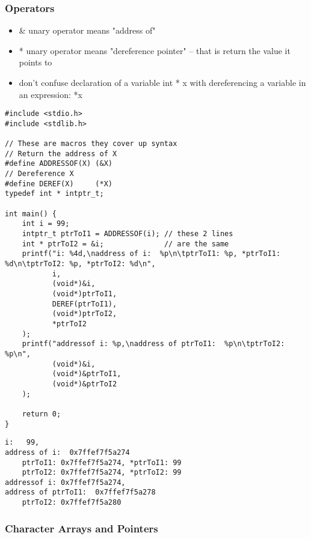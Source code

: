 \documentclass[11pt]{article}
\begin{document}
\subsubsection{Operators}
\label{sec:org8cbbc68}

\begin{itemize}
\item \& unary operator means "address of"
\item * unary operator means "dereference pointer" -- that is return
the value it points to
\item don't confuse declaration of a variable int * x with
dereferencing a variable in an expression: *x
\end{itemize}

\begin{verbatim}
#include <stdio.h>
#include <stdlib.h>

// These are macros they cover up syntax
// Return the address of X
#define ADDRESSOF(X) (&X)
// Dereference X
#define DEREF(X)     (*X)
typedef int * intptr_t;

int main() {
    int i = 99;
    intptr_t ptrToI1 = ADDRESSOF(i); // these 2 lines
    int * ptrToI2 = &i;              // are the same
    printf("i: %4d,\naddress of i:  %p\n\tptrToI1: %p, *ptrToI1: %d\n\tptrToI2: %p, *ptrToI2: %d\n",
           i,
           (void*)&i,
           (void*)ptrToI1,
           DEREF(ptrToI1),
           (void*)ptrToI2,
           *ptrToI2
    );
    printf("addressof i: %p,\naddress of ptrToI1:  %p\n\tptrToI2: %p\n",
           (void*)&i,
           (void*)&ptrToI1,
           (void*)&ptrToI2
    );

    return 0;
}
\end{verbatim}

\begin{verbatim}
i:   99,
address of i:  0x7ffef7f5a274
	ptrToI1: 0x7ffef7f5a274, *ptrToI1: 99
	ptrToI2: 0x7ffef7f5a274, *ptrToI2: 99
addressof i: 0x7ffef7f5a274,
address of ptrToI1:  0x7ffef7f5a278
	ptrToI2: 0x7ffef7f5a280
\end{verbatim}



\subsubsection{Character Arrays and Pointers}
\label{sec:orgabd2b67}
\end{document}

